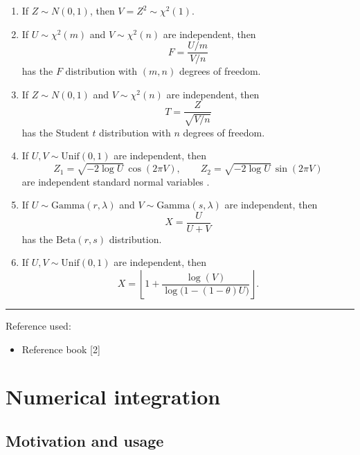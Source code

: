 \documentclass[
  letterpaper,
  DIV=11,
  numbers=noendperiod]{scrreprt}
\providecommand{\tightlist}{%
  \setlength{\itemsep}{0pt}\setlength{\parskip}{0pt}}
\begin{document}
\begin{enumerate}
  \item If $Z \sim N(0,1)$, then $V = Z^2 \sim \chi^2(1)$.
  
  \item If $U \sim \chi^2(m)$ and $V \sim \chi^2(n)$ are independent, then 
  \[
  F = \frac{U/m}{V/n}
  \]
  has the $F$ distribution with $(m,n)$ degrees of freedom.
  
  \item If $Z \sim N(0,1)$ and $V \sim \chi^2(n)$ are independent, then 
  \[
  T = \frac{Z}{\sqrt{V/n}}
  \]
  has the Student $t$ distribution with $n$ degrees of freedom.
  
  \item If $U,V \sim \text{Unif}(0,1)$ are independent, then
  \[
  Z_1 = \sqrt{-2 \log U}\, \cos(2\pi V), 
  \qquad
  Z_2 = \sqrt{-2 \log U}\, \sin(2\pi V)
  \]
  are independent standard normal variables \cite[p.~86]{ref255}.
  
  \item If $U \sim \text{Gamma}(r,\lambda)$ and $V \sim \text{Gamma}(s,\lambda)$ are independent, then 
  \[
  X = \frac{U}{U+V}
  \]
  has the $\text{Beta}(r,s)$ distribution.
  
  \item If $U,V \sim \text{Unif}(0,1)$ are independent, then
  \[
  X = \left\lfloor 1 + \frac{\log(V)}{\log\big(1 - (1-\theta)U\big)} \right\rfloor.
  \]
\end{enumerate}

\begin{center}\rule{0.5\linewidth}{0.5pt}\end{center}

Reference used:

\begin{itemize}
\tightlist
\item
  Reference book {[}2{]}
\end{itemize}


\chapter{Numerical integration}\label{numerical-integration}

\newcommand{\E}{\mathbb E}
\newcommand{\X}{\mathcal X}

\section{Motivation and usage}\label{motivation-and-usage}
\end{document}
